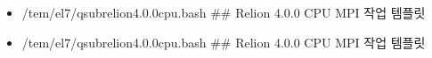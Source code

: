 \documentclass[a4paper,10pt,english]{sphinxmanual}
\begin{document}
\begin{itemize}
\begin{itemize}
\begin{itemize}
\item {} 
\sphinxAtStartPar
/tem/el7/qsub\sphinxhyphen{}relion\sphinxhyphen{}4.0.0\sphinxhyphen{}cpu.bash           \#\# Relion 4.0.0 CPU MPI 작업 템플릿

\item {} 
\sphinxAtStartPar
/tem/el7/qsub\sphinxhyphen{}relion\sphinxhyphen{}4.0.0\sphinxhyphen{}cpu.bash           \#\# Relion 4.0.0 CPU MPI 작업 템플릿

\end{itemize}

\end{itemize}

\end{itemize}

\end{document}
